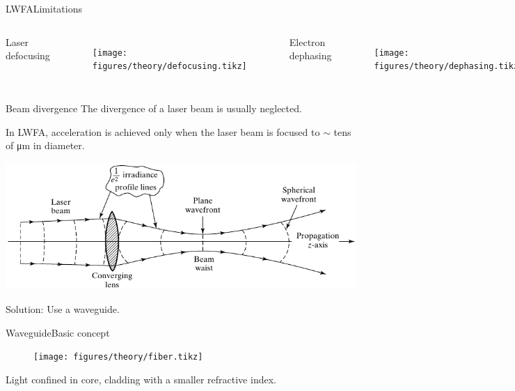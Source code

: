 \documentclass[dvipsnames]{beamer}
\begin{document}
\begin{frame}{LWFA}{Limitations}
\begin{columns}  
Laser defocusing
\begin{figure}
\texttt{[image: figures/theory/defocusing.tikz]}
\end{figure}
Electron dephasing
\begin{figure}
\texttt{[image: figures/theory/dephasing.tikz]}
\end{figure}
\end{columns}
\end{frame}
\begin{frame}{Beam divergence}
The divergence of a laser beam is usually neglected.

In LWFA, acceleration is achieved only when the laser beam is focused to $\sim$ tens of \si{\um} in diameter.
\begin{center}
  \includegraphics[width=\textwidth]{figures/theory/laser_lens_rayleigh.pdf}
\end{center}
Solution: Use a waveguide.
\end{frame}
\begin{frame}{Waveguide}{Basic concept}
 \begin{figure}
 \texttt{[image: figures/theory/fiber.tikz]}
  \end{figure}
  Light confined in core, cladding with a smaller refractive index.
\end{frame}
\end{document}
